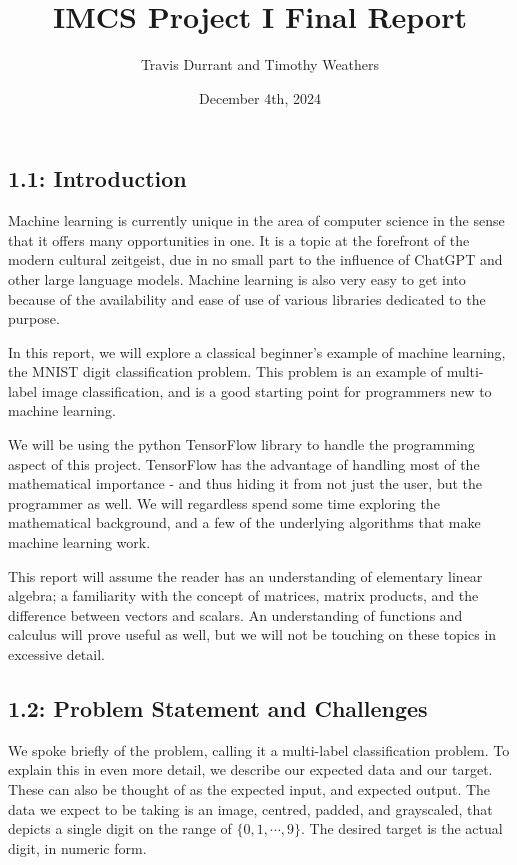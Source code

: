 \documentclass{article}
\title{IMCS Project I Final Report}
\author{Travis Durrant and Timothy Weathers}
\date{December 4th, 2024}
\begin{document}
\maketitle
\subsection*{1.1: Introduction}
Machine learning is currently unique in the area of computer science in the sense that it offers many opportunities in one. It is a topic at the forefront of the modern cultural zeitgeist, due in no small part to the influence of ChatGPT and other large language models. Machine learning is also very easy to get into because of the availability and ease of use of various libraries dedicated to the purpose.

In this report, we will explore a classical beginner’s example of machine learning, the MNIST digit classification problem. This problem is an example of multi-label image classification, and is a good starting point for programmers new to machine learning.

We will be using the python TensorFlow library to handle the programming aspect of this project. TensorFlow has the advantage of handling most of the mathematical importance - and thus hiding it from not just the user, but the programmer as well. We will regardless spend some time exploring the mathematical background, and a few of the underlying algorithms that make machine learning work.


This report will assume the reader has an understanding of elementary linear algebra; a familiarity with the concept of matrices, matrix products, and the difference between vectors and scalars. An understanding of functions and calculus will prove useful as well, but we will not be touching on these topics in excessive detail.
\\
\subsection*{1.2: Problem Statement and Challenges}
We spoke briefly of the problem, calling it a multi-label classification problem. To explain this in even more detail, we describe our expected data and our target. These can also be thought of as the expected input, and expected output. The data we expect to be taking is an image, centred, padded, and grayscaled, that depicts a single digit on the range of $\{0,1,\cdots,9\}$. The desired target is the actual digit, in numeric form.
\end{document}
